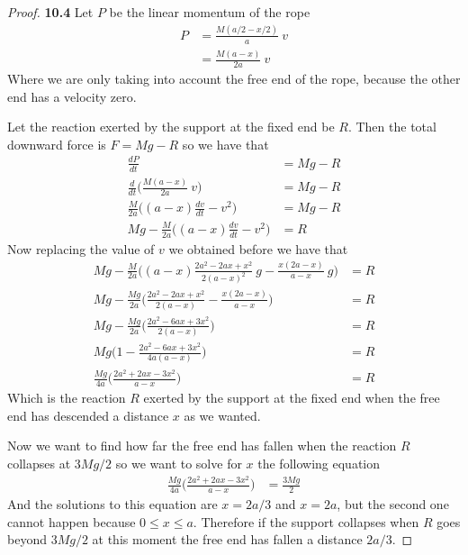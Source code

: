 \documentclass[11pt]{article}
\theoremstyle{definition}
\begin{document}
	\begin{proof}{\textbf{10.4}}
        Let $P$ be the linear momentum of the rope 
        \begin{align*}
            P &= \frac{M(a/2 - x/2)}{a}~v\\
                &= \frac{M(a - x)}{2a}~v
        \end{align*}
        Where we are only taking into account the free end of the rope,
        because the other end has a velocity zero. 

        Let the reaction exerted by the support at the fixed end be $R$. Then
        the total downward force is $F = Mg - R$ so we have that
        \begin{align*}
            \frac{dP}{dt} &= Mg - R\\
            \frac{d}{dt}\bigg(\frac{M(a - x)}{2a}~v\bigg) &= Mg - R\\
            \frac{M}{2a}\bigg((a - x)\frac{dv}{dt} - v^2\bigg) &= Mg - R\\
            Mg - \frac{M}{2a}\bigg((a - x)\frac{dv}{dt} - v^2\bigg) &= R
        \end{align*}
        Now replacing the value of $v$ we obtained before we have that
        \begin{align*}
            Mg - \frac{M}{2a}\bigg((a - x)\frac{2a^2 - 2ax +x^2}{2(a-x)^2}~g
            - \frac{x(2a-x)}{a-x}~g \bigg) &= R\\
            Mg - \frac{Mg}{2a}\bigg(\frac{2a^2 - 2ax +x^2}{2(a-x)}
            - \frac{x(2a-x)}{a-x} \bigg) &= R\\
            Mg - \frac{Mg}{2a}
            \bigg(\frac{2a^2 - 6ax +3x^2}{2(a-x)}\bigg) &= R\\
            Mg\bigg(1 - \frac{2a^2 - 6ax +3x^2}{4a(a-x)}\bigg) &= R\\
            \frac{Mg}{4a}\bigg(\frac{2a^2 + 2ax -3x^2}{a-x}\bigg) &= R
        \end{align*}
        Which is the reaction $R$ exerted by the support at the ﬁxed end when
        the free end has descended a distance $x$ as we wanted.

        Now we want to find how far the free end has fallen when the reaction
        $R$ collapses at $3Mg/2$ so we want to solve for $x$ the following
        equation
        \begin{align*}
            \frac{Mg}{4a}\bigg(\frac{2a^2 + 2ax -3x^2}{a-x}\bigg) &= \frac{3Mg}{2}
        \end{align*}
        And the solutions to this equation are $x=2a/3$ and $x=2a$, but
        the second one cannot happen because $0 \leq x \leq a$.
        Therefore if the support collapses when $R$ goes beyond $3Mg/2$ at
        this moment the free end has fallen a distance $2a/3$.
    \end{proof}
\end{document}
